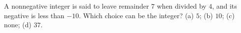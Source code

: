 A nonnegative integer is said to leave remainder $7$ when divided by $4$, and its negative is less than $-10$. Which choice can be the integer? (a) $5$; (b) $10$; (c) none; (d) $37$.
